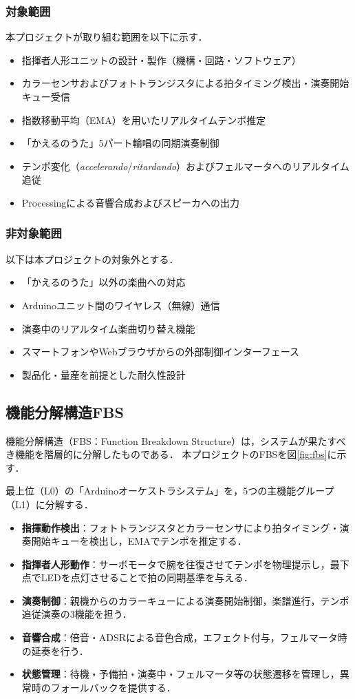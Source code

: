 \subsubsection{対象範囲}
本プロジェクトが取り組む範囲を以下に示す．
\begin{itemize}
  \item 指揮者人形ユニットの設計・製作（機構・回路・ソフトウェア）
  \item カラーセンサおよびフォトトランジスタによる拍タイミング検出・演奏開始キュー受信
  \item 指数移動平均（EMA）を用いたリアルタイムテンポ推定
  \item 「かえるのうた」5パート輪唱の同期演奏制御
  \item テンポ変化（\textit{accelerando}/\textit{ritardando}）およびフェルマータへのリアルタイム追従
  \item Processingによる音響合成およびスピーカへの出力
\end{itemize}

\subsubsection{非対象範囲}
以下は本プロジェクトの対象外とする．
\begin{itemize}
  \item 「かえるのうた」以外の楽曲への対応
  \item Arduinoユニット間のワイヤレス（無線）通信
  \item 演奏中のリアルタイム楽曲切り替え機能
  \item スマートフォンやWebブラウザからの外部制御インターフェース
  \item 製品化・量産を前提とした耐久性設計
\end{itemize}

\subsection{機能分解構造FBS}

機能分解構造（FBS：Function Breakdown Structure）は，システムが果たすべき機能を階層的に分解したものである．
本プロジェクトのFBSを図\ref{fig:fbs}に示す．

最上位（L0）の「Arduinoオーケストラシステム」を，5つの主機能グループ（L1）に分解する．
\begin{itemize}
  \item \textbf{指揮動作検出}：フォトトランジスタとカラーセンサにより拍タイミング・演奏開始キューを検出し，EMAでテンポを推定する．
  \item \textbf{指揮者人形動作}：サーボモータで腕を往復させてテンポを物理提示し，最下点でLEDを点灯させることで拍の同期基準を与える．
  \item \textbf{演奏制御}：親機からのカラーキューによる演奏開始制御，楽譜進行，テンポ追従演奏の3機能を担う．
  \item \textbf{音響合成}：倍音・ADSRによる音色合成，エフェクト付与，フェルマータ時の延奏を行う．
  \item \textbf{状態管理}：待機・予備拍・演奏中・フェルマータ等の状態遷移を管理し，異常時のフォールバックを提供する．
\end{itemize}

